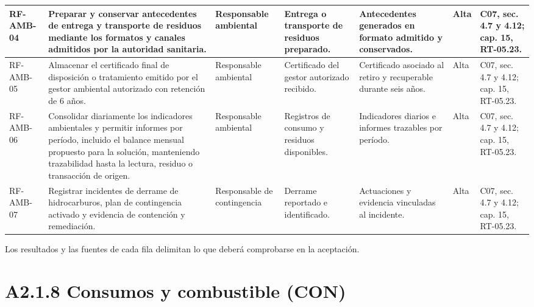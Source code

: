 \begin{longtable}{|L{0.080645\AnchoTablaAnexo}|L{0.262097\AnchoTablaAnexo}|L{0.100806\AnchoTablaAnexo}|L{0.145161\AnchoTablaAnexo}|L{0.173387\AnchoTablaAnexo}|L{0.060484\AnchoTablaAnexo}|L{0.177420\AnchoTablaAnexo}|}
RF-\allowbreak{}AMB-\allowbreak{}04 &
Preparar y conservar antecedentes de entrega y transporte de residuos mediante los formatos y canales admitidos por la autoridad sanitaria. &
Responsable ambiental &
Entrega o transporte de residuos preparado. &
Antecedentes generados en formato admitido y conservados. &
Alta &
C07, sec. 4.7 y 4.12; cap. 15, RT-05.23. \\ \hline

RF-\allowbreak{}AMB-\allowbreak{}05 &
Almacenar el certificado final de disposición o tratamiento emitido por el gestor ambiental autorizado con retención de 6 años. &
Responsable ambiental &
Certificado del gestor autorizado recibido. &
Certificado asociado al retiro y recuperable durante seis años. &
Alta &
C07, sec. 4.7 y 4.12; cap. 15, RT-05.23. \\ \hline

RF-\allowbreak{}AMB-\allowbreak{}06 &
Consolidar diariamente los indicadores ambientales y permitir informes por período, incluido el balance mensual propuesto para la solución, manteniendo trazabilidad hasta la lectura, residuo o transacción de origen. &
Responsable ambiental &
Registros de consumo y residuos disponibles. &
Indicadores diarios e informes trazables por período. &
Alta &
C07, sec. 4.7 y 4.12; cap. 15, RT-05.23. \\ \hline

RF-\allowbreak{}AMB-\allowbreak{}07 &
Registrar incidentes de derrame de hidrocarburos, plan de contingencia activado y evidencia de contención y remediación. &
Responsable de contingencia &
Derrame reportado e identificado. &
Actuaciones y evidencia vinculadas al incidente. &
Alta &
C07, sec. 4.7 y 4.12; cap. 15, RT-05.23. \\ \hline

\end{longtable}

Los resultados y las fuentes de cada fila delimitan lo que deberá comprobarse en la aceptación.

\clearpage\section*{A2.1.8 Consumos y combustible (CON)}


